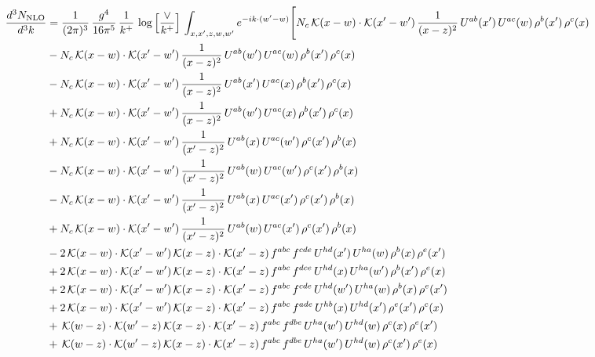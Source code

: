 \documentclass[10pt]{article}
\numberwithin{equation}{section}
\begin{document}
\begin{align}
    \frac{d^{3}N_{\mathrm{NLO}}}{d^{3}k} & = \frac{1}{(2\pi)^{3}}\,\frac{g^{4}}{16\pi^{5}}\,\frac{1}{k^{+}}\,\log\Big[\frac{\vee}{k^{+}}\Big]\,\int_{x,x',z,w,w'}e^{-ik\cdot(w'-w)}\Bigg[N_{c}\,\mathcal{K}(x-w)\cdot\mathcal{K}(x'-w')\,\frac{1}{(x-z)^{2}}\,U^{ab}(x')\,U^{ac}(w)\,\rho^{b}(x')\,\rho^{c}(x)\notag\\
&-N_{c}\,\mathcal{K}(x-w)\cdot\mathcal{K}(x'-w')\,\frac{1}{(x-z)^{2}}\,U^{ab}(w')\,U^{ac}(w)\,\rho^{b}(x')\,\rho^{c}(x)\notag\\
&-N_{c}\,\mathcal{K}(x-w)\cdot\mathcal{K}(x'-w')\,\frac{1}{(x-z)^{2}}\,U^{ab}(x')\,U^{ac}(x)\,\rho^{b}(x')\,\rho^{c}(x)\notag\\
&+N_{c}\,\mathcal{K}(x-w)\cdot\mathcal{K}(x'-w')\,\frac{1}{(x-z)^{2}}\,U^{ab}(w')\,U^{ac}(x)\,\rho^{b}(x')\,\rho^{c}(x)\notag\\
&+N_{c}\,\mathcal{K}(x-w)\cdot\mathcal{K}(x'-w')\,\frac{1}{(x'-z)^{2}}\,U^{ab}(x)\,U^{ac}(w')\,\rho^{c}(x')\,\rho^{b}(x)\notag\\
&-N_{c}\,\mathcal{K}(x-w)\cdot\mathcal{K}(x'-w')\,\frac{1}{(x'-z)^{2}}\,U^{ab}(w)\,U^{ac}(w')\,\rho^{c}(x')\,\rho^{b}(x)\notag\\
&-N_{c}\,\mathcal{K}(x-w)\cdot\mathcal{K}(x'-w')\,\frac{1}{(x'-z)^{2}}\,U^{ab}(x)\,U^{ac}(x')\,\rho^{c}(x')\,\rho^{b}(x)\notag\\
&+N_{c}\,\mathcal{K}(x-w)\cdot\mathcal{K}(x'-w')\,\frac{1}{(x'-z)^{2}}\,U^{ab}(w)\,U^{ac}(x')\,\rho^{c}(x')\,\rho^{b}(x)\notag\\
&-2\,\mathcal{K}(x-w)\cdot\mathcal{K}(x'-w')\,\mathcal{K}(x-z)\cdot\mathcal{K}(x'-z)\,f^{abc}\,f^{cde}\,U^{hd}(x')\,U^{ha}(w)\,\rho^{b}(x)\,\rho^{e}(x')\notag\\
&+2\,\mathcal{K}(x-w)\cdot\mathcal{K}(x'-w')\,\mathcal{K}(x-z)\cdot\mathcal{K}(x'-z)\,f^{abc}\,f^{dce}\,U^{hd}(x)\,U^{ha}(w')\,\rho^{b}(x')\,\rho^{e}(x)\notag\\
&+2\,\mathcal{K}(x-w)\cdot\mathcal{K}(x'-w')\,\mathcal{K}(x-z)\cdot\mathcal{K}(x'-z)\,f^{abc}\,f^{cde}\,U^{hd}(w')\,U^{ha}(w)\,\rho^{b}(x)\,\rho^{e}(x')\notag\\
&+2\,\mathcal{K}(x-w)\cdot\mathcal{K}(x'-w')\,\mathcal{K}(x-z)\cdot\mathcal{K}(x'-z)\,f^{abc}\,f^{ade}\,U^{hb}(x)\,U^{hd}(x')\,\rho^{e}(x')\,\rho^{c}(x)\notag\\
&+\,\mathcal{K}(w-z)\cdot\mathcal{K}(w'-z)\,\mathcal{K}(x-z)\cdot\mathcal{K}(x'-z)\,f^{abc}\,f^{dbe}\,U^{ha}(w')\,U^{hd}(w)\,\rho^{c}(x)\,\rho^{e}(x')\notag\\
&+\,\mathcal{K}(w-z)\cdot\mathcal{K}(w'-z)\,\mathcal{K}(x-z)\cdot\mathcal{K}(x'-z)\,f^{abc}\,f^{dbe}\,U^{ha}(w')\,U^{hd}(w)\,\rho^{c}(x')\,\rho^{e}(x)\notag\\

\end{align}
\end{document}
